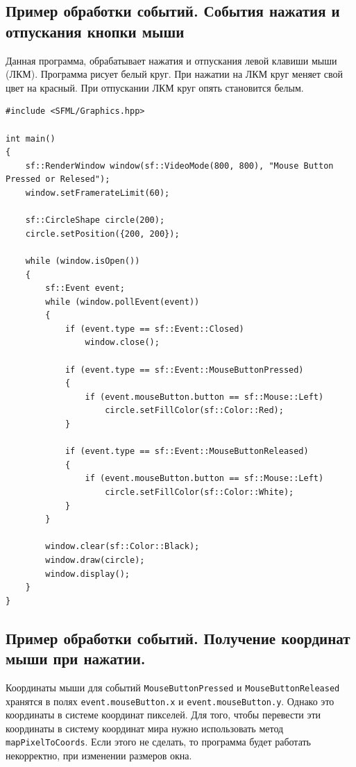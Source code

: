 \documentclass{article}
\begin{document}
\subsection*{Пример обработки событий. События нажатия и отпускания кнопки мыши}
Данная программа, обрабатывает нажатия и отпускания левой клавиши мыши (ЛКМ).
Программа рисует белый круг.
При нажатии на ЛКМ круг меняет свой цвет на красный.
При отпускании ЛКМ круг опять становится белым.
\begin{lstlisting}
#include <SFML/Graphics.hpp>

int main()
{
    sf::RenderWindow window(sf::VideoMode(800, 800), "Mouse Button Pressed or Relesed");
    window.setFramerateLimit(60);
    
    sf::CircleShape circle(200);
    circle.setPosition({200, 200});

    while (window.isOpen()) 
    {
        sf::Event event;
        while (window.pollEvent(event)) 
        {
            if (event.type == sf::Event::Closed)
                window.close();

            if (event.type == sf::Event::MouseButtonPressed)
            {
                if (event.mouseButton.button == sf::Mouse::Left)
                    circle.setFillColor(sf::Color::Red);
            }

            if (event.type == sf::Event::MouseButtonReleased)
            {
                if (event.mouseButton.button == sf::Mouse::Left)
                    circle.setFillColor(sf::Color::White);
            }
        }

        window.clear(sf::Color::Black);
        window.draw(circle);
        window.display();
    }
}
\end{lstlisting}



\newpage
\subsection*{Пример обработки событий. Получение координат мыши при нажатии.}
Координаты мыши для событий \texttt{MouseButtonPressed} и \texttt{MouseButtonReleased} хранятся в полях \texttt{event.mouseButton.x} и \texttt{event.mouseButton.y}. Однако это координаты в системе координат пикселей. Для того, чтобы перевести эти координаты в систему координат мира нужно использовать метод \texttt{mapPixelToCoords}. Если этого не сделать, то программа будет работать некорректно, при изменении размеров окна.
\end{document}
